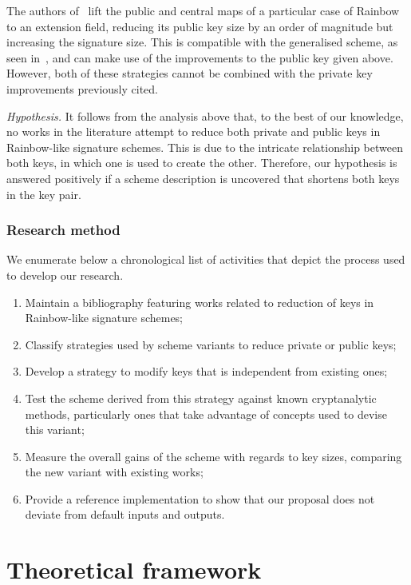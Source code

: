 \documentclass[openright, draft, 10pt]{report}
\begin{document}
The authors of~\cite{Szepieniec:201706:inproc} lift the public and central maps
of a particular case of Rainbow to an extension field, reducing its public 
key size by an order of magnitude but increasing the signature size. This is 
compatible with the generalised scheme, as seen in~\cite{Beullens:201706:msc,Beullens:201712:inproc},
and can make use of the improvements to the public key given above. However,
both of these strategies cannot be combined with the private key improvements
previously cited. 

\emph{Hypothesis.} It follows from the analysis above that, to the best of our knowledge, no works in the literature attempt to reduce both private and public keys in Rainbow-like signature schemes. This is due to the intricate relationship between both keys, in which one is used to create the other. Therefore, our hypothesis is answered positively if a scheme description is uncovered that shortens both keys in the key pair.

\subsection{Research method}

We enumerate below a chronological list of activities that depict the process used to develop our research.

\begin{enumerate}[label=(\roman*), itemsep=1pt]
    \item Maintain a bibliography featuring works related to reduction of keys in Rainbow-like signature schemes;
    \item Classify strategies used by scheme variants to reduce private or public keys;
    \item Develop a strategy to modify keys that is independent from existing ones;
    \item Test the scheme derived from this strategy against known cryptanalytic methods, particularly ones that take advantage of concepts used to devise this variant;
    \item Measure the overall gains of the scheme with regards to key sizes, comparing the new variant with existing works;
    \item Provide a reference implementation to show that our proposal does not deviate from default inputs and outputs.
\end{enumerate}

\chapter{Theoretical framework}
\end{document}
